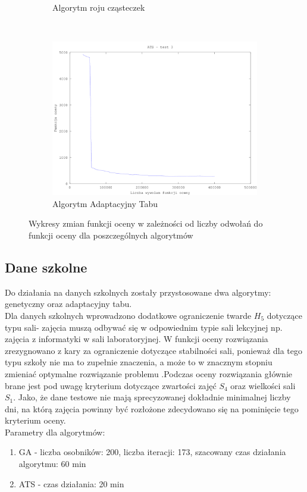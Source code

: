 \begin{figure}[H]
\begin{subfigure}[b]{0.5\textwidth}
                \caption{Algorytm roju cząsteczek}
        \end{subfigure}
        ~ %
          \\
        \begin{subfigure}[b]{0.5\textwidth}
                \includegraphics[width=\textwidth]{ats_test_3.png}
                \caption{Algorytm Adaptacyjny Tabu}
        \end{subfigure}
        \caption{Wykresy zmian funkcji oceny w zależności od liczby odwołań do funkcji oceny dla poszczególnych algorytmów}
\end{figure}
\subsection{Dane szkolne}
Do działania na danych szkolnych zostały przystosowane dwa algorytmy: genetyczny oraz adaptacyjny tabu. \\
Dla danych szkolnych wprowadzono dodatkowe ograniczenie twarde ${H_{5}}$ dotyczące typu sali- zajęcia muszą odbywać się w odpowiednim typie sali lekcyjnej np. zajęcia z informatyki w sali laboratoryjnej. W funkcji oceny rozwiązania zrezygnowano z kary za ograniczenie dotyczące stabilności sali, ponieważ dla tego typu szkoły nie ma to zupełnie znaczenia, a może to w znacznym stopniu zmieniać optymalne rozwiązanie problemu .Podczas oceny rozwiązania głównie brane jest pod uwagę kryterium dotyczące zwartości zajęć ${S_{4}}$ oraz wielkości sali ${S_{1}}$. Jako, że dane testowe nie mają sprecyzowanej dokładnie minimalnej liczby dni, na którą zajęcia powinny być rozłożone zdecydowano się na pominięcie tego kryterium oceny. \\
Parametry dla algorytmów:
\begin{enumerate}
\item GA - liczba osobników: 200, liczba iteracji: 173, szacowany czas działania algorytmu: 60 min
\item ATS - czas działania: 20 min
\end{enumerate}

